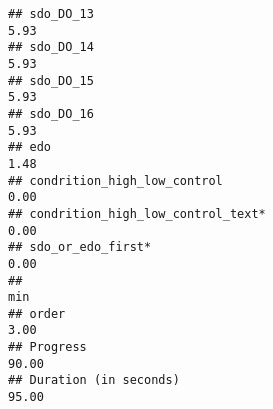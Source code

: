 \documentclass[
]{article}
\begin{document}
\begin{verbatim}
## sdo_DO_13                                                                                                                                                                                                                    5.93
## sdo_DO_14                                                                                                                                                                                                                    5.93
## sdo_DO_15                                                                                                                                                                                                                    5.93
## sdo_DO_16                                                                                                                                                                                                                    5.93
## edo                                                                                                                                                                                                                          1.48
## condrition_high_low_control                                                                                                                                                                                                  0.00
## condrition_high_low_control_text*                                                                                                                                                                                            0.00
## sdo_or_edo_first*                                                                                                                                                                                                            0.00
##                                                                                                                                                                                                                              min
## order                                                                                                                                                                                                                       3.00
## Progress                                                                                                                                                                                                                   90.00
## Duration (in seconds)                                                                                                                                                                                                      95.00

\end{verbatim}
\end{document}
